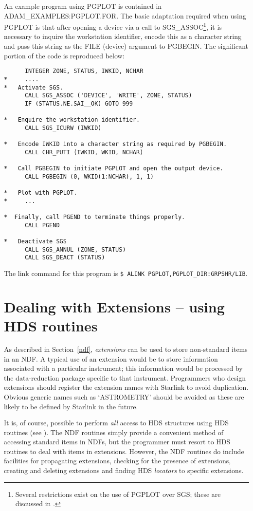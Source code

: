 An example program using PGPLOT is contained in ADAM\_EXAMPLES:PGPLOT.FOR.
The basic adaptation required when using PGPLOT is that after opening
a device via a call to 
SGS\_ASSOC\footnote{Several restrictions exist on the use of PGPLOT over SGS;
these are discussed in .}, it is necessary to 
inquire the workstation identifier, encode this as a character string and pass 
this string as the FILE (device) argument to PGBEGIN.
The significant portion of the code is reproduced below:
\begin{verbatim}
      INTEGER ZONE, STATUS, IWKID, NCHAR
*     ....
*   Activate SGS.
      CALL SGS_ASSOC ('DEVICE', 'WRITE', ZONE, STATUS)
      IF (STATUS.NE.SAI__OK) GOTO 999

*   Enquire the workstation identifier.  
      CALL SGS_ICURW (IWKID)
   
*   Encode IWKID into a character string as required by PGBEGIN.
      CALL CHR_PUTI (IWKID, WKID, NCHAR)

*   Call PGBEGIN to initiate PGPLOT and open the output device.
      CALL PGBEGIN (0, WKID(1:NCHAR), 1, 1)

*   Plot with PGPLOT.
*     ...

*  Finally, call PGEND to terminate things properly.
      CALL PGEND

*   Deactivate SGS
      CALL SGS_ANNUL (ZONE, STATUS)
      CALL SGS_DEACT (STATUS)
\end{verbatim}
The link command for this  program is 
{\tt \$ ALINK PGPLOT,PGPLOT\_DIR:GRPSHR/LIB}.

\newpage
\section{Dealing with Extensions -- using HDS routines\label{extensions}}

As described in Section~\ref{ndf}, {\sl extensions} can be used to store
non-standard items in an NDF.
A typical use of an extension would be to store information 
associated with a particular instrument;
this information would be processed by the data-reduction package specific 
to that instrument.
Programmers who design extensions  should register
the extension names with Starlink to avoid duplication.
Obvious generic names such as `ASTROMETRY' should be avoided  as these are 
likely to be defined by Starlink in the future.

It is, of course, possible to perform {\sl all\/} access to HDS structures
using HDS routines (see ). The NDF routines simply
provide a convenient method of accessing standard items in NDFs, but
the programmer must 
resort to HDS routines to deal with items in extensions.
However, the NDF routines do include facilities for propagating extensions,
checking for the presence of extensions, creating and deleting extensions
and finding HDS {\sl locators\/} to specific extensions.

